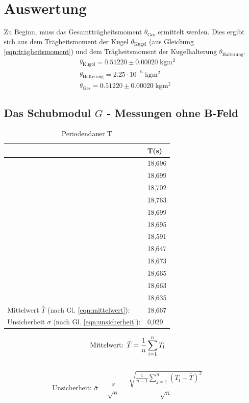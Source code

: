
\newpage
\section{Auswertung}
Zu Beginn, muss das Gesamtträgheitsmoment $\theta_\text{Ges}$ ermittelt werden.
Dies ergibt sich aus dem Trägheitsmoment der Kugel $\theta_\text{Kugel}$ (aus Gleichung \ref{eqn:trägheitsmoment}) und
dem Trägheitsmoment der Kugelhalterung $\theta_\text{Halterung}$.
\begin{gather*}
    \theta_\text{Kugel}=0.51220 \pm 0.00020\;\mathrm{kgm^2}\\ %
    \theta_\text{Halterung}=2.25\cdot 10^{-6} \;\mathrm{kgm^2}\\ %
    \theta_\text{Ges}=0.51220 \pm 0.00020 \;\mathrm{kgm^2} %
\end{gather*}

\subsection{Das Schubmodul $G$ - Messungen ohne B-Feld}
\begin{table}
    \centering
    \label{tab:tabelle_1}
    \begin{tabular}{p{3cm} | p{2cm}}
    \toprule
    & T(s) \\
    \midrule
    &18,696\\
    &18,699\\
    &18,702\\
    &18,763\\
    &18,699\\
    &18,695\\
    &18,591\\
    &18,647\\
    &18,673\\
    &18,665\\
    &18,663\\
    &18,635\\
    \midrule
    Mittelwert $\bar{T}$ (nach Gl. \ref{eqn:mittelwert}):     & 18,667 \\
    Unsicherheit $\sigma$ (nach Gl. \ref{eqn:unsicherheit}):  & 0,029 \\
    \bottomrule
    \end{tabular}
    \caption{Periodendauer T}
\end{table}
\begin{equation}
    \textrm{Mittelwert: } \bar{T}=\frac{1}{n}\sum_{i=1}^{n}T_\text{i}\\\\
    \label{eqn:mittelwert}
\end{equation}\\
\begin{equation}
    \textrm{Unsicherheit: } \bar{\sigma}=\frac{s}{\sqrt{n}}=\frac{\sqrt{\frac{1}{n-1}\sum_{j=1}^n(T_\text{j}-\bar{T})^2}}{\sqrt{n}}
    \label{eqn:unsicherheit}
\end{equation}


